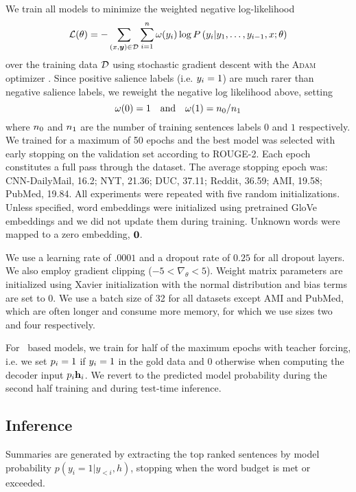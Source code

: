 We train all models to minimize the weighted negative log-likelihood
\[\mathcal{L(\theta)} = -\sum_{(x,\boldsymbol{y}) \in \mathcal{D} } \sum_{i=1}^n \omega(y_i) \log P\left(y_i|y_1,\ldots,y_{i-1},x;\theta\right) \]
over the training data $\mathcal{D}$
using stochastic gradient descent with the \textsc{Adam} optimizer
\citep{kingma2014adam}. Since positive salience labels (i.e. $y_i = 1$)
are much rarer than negative salience labels, we reweight the negative
log likelihood above, setting
\[\omega(0)=1 \quad \textrm{and}\quad \omega(1) = n_0/n_1\] where $n_0$ and $n_1$ 
are the number of training sentences labels $0$ and $1$ respectively.
    We trained for a maximum of 50 epochs and the best
    model was selected with early stopping on the validation set according
    to ROUGE-2. Each epoch constitutes a full pass through the
    dataset. The average stopping epoch was: CNN-DailyMail, 16.2; NYT, 21.36; DUC, 37.11; Reddit, 36.59; AMI, 19.58; PubMed, 19.84.
     All experiments were repeated with five random
    initializations.     Unless specified, word embeddings were initialized 
    using pretrained GloVe embeddings \citep{pennington2014glove} and we did 
    not update them during training. Unknown words were mapped to a zero 
    embedding, $\mathbf{0}$.

    We use a learning rate of $.0001$ and a dropout rate of $0.25$ for all dropout
    layers. We also employ gradient clipping ($-5 < \nabla_\theta < 5$).
    Weight matrix parameters are initialized using 
    Xavier initialization with the normal distribution 
    \citep{glorot2010understanding} and bias terms are set to $0$.
    We use a batch size of 32 for all datasets except AMI and PubMed, which
    are often longer and consume more memory, for
    which we use sizes two and four respectively.

    For \clext~based models, we train for half of the maximum epochs 
    with teacher forcing, i.e. we set $p_i = 1$
    if $y_i = 1$ in the gold data and $0$ otherwise 
    when computing the decoder input 
    $p_i \mathbf{h}_i$. We revert to the predicted model probability 
    during the second half training and during test-time inference.




\subsection{Inference} \label{sec:inference}
Summaries are generated by extracting the top ranked sentences by model probability $p(y_i=1|y_{<i},h)$, stopping when the word budget is met or exceeded.



